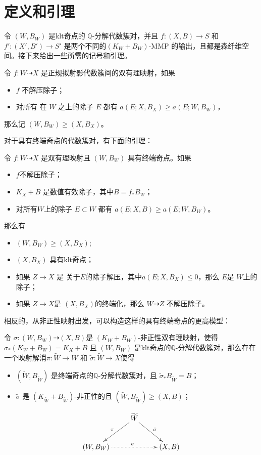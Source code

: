 \section{定义和引理}
令 $(W, B_W)$ 是klt奇点的 $\mathbb{Q}$-分解代数簇对，并且 $f:(X, B)\to S$ 和 $f':(X', B')\to S'$ 是两个不同的$(K_{W}+B_{W})$-MMP 的输出，且都是森纤维空间。接下来给出一些所需的记号和引理。 
\begin{definition}\label{doubleorder}
  令 $f: W\dashrightarrow X$ 是正规拟射影代数簇间的双有理映射，如果
  \begin{itemize}
    \item $f$ 不解压除子；
    \item 对所有 在 $W$ 之上的除子 $E$ 都有  $a(E;X,B_{X})\geqslant a(E;W,B_{W})$，
  \end{itemize}
  那么记 $(W,B_{W})\geqslant (X,B_{X})$。
\end{definition}
对于具有终端奇点的代数簇对，有下面的引理：
\begin{lemma}\label{terminalorder}
  \cite[Lemma 13.8]{haconMinimalModelProgram2012} 令 $f:W\dashrightarrow X$ 是双有理映射且 $(W,B_{W})$  具有终端奇点。如果
  \begin{itemize}
    \item $f$不解压除子；
    \item $K_X+B$ 是数值有效除子，其中$B=f_*B_W$；
    \item  对所有$ W$上的除子 $E \subset W$ 都有 $a(E;X,B)\geqslant a(E;W,B_{W})$。
  \end{itemize}
  那么有
  \begin{itemize}
    \item $(W,B_{W})\geqslant (X,B_{X})$;
    \item $(X,B_{X})$ 具有klt奇点；
    \item 如果 $Z\to X$ 是 关于$E$的除子解压，其中$a(E;X,B_{X})\leqslant 0$，那么 $E$是 $W$上的除子；
    \item 如果 $Z\to X$是 $(X,B_{X})$的终端化，那么 $W\dashrightarrow Z$ 不解压除子。
  \end{itemize}
\end{lemma}
相反的，从非正性映射出发，可以构造这样的具有终端奇点的更高模型：
\begin{lemma}\label{terminalresolution}
  \cite[Lemma 3.5]{liuSarkisovProgramGeneralized2021} 令 $\sigma:(W,B_W)\dashrightarrow (X,B)$是 $(K_W+B_W)$-非正性双有理映射，使得 $\sigma_*(K_W+B_W)=K_X+B$ 且 $(W,B_W)$ 是klt奇点的$\mathbb{Q}$-分解代数簇对，那么存在一个映射解消$\pi:\tilde{W}\to W $ 和 $\tilde{\sigma}:\tilde{W}\to X$使得 
  \begin{itemize}
    \item $(\tilde{W},B_{\tilde{W}})$ 是终端奇点的$\mathbb{Q}$-分解代数簇对，且 $\tilde{\sigma}_*B_{\tilde{W}}=B$；
    \item $\tilde{\sigma}$ 是 $(K_{\tilde{W}}+B_{\tilde{W}})$-非正性的且 $(\tilde{W},B_{\tilde{W}})\geqslant (X,B)$；
  \end{itemize}
  \[ \xymatrix{
    & \widetilde{W}\ar[ld]_{\pi}\ar[rd]^{\bar{\sigma}} & \\
      (W,B_{W})\ar@{.>}[rr]^{\sigma} & &(X,B)
    } \]
\end{lemma}


